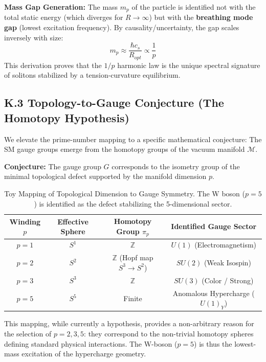 \documentclass[a4paper,12pt]{article}
\begin{document}
\textbf{Mass Gap Generation:}
The mass $m_p$ of the particle is identified not with the total static energy (which diverges for $R \to \infty$) but with the \textbf{breathing mode gap} (lowest excitation frequency). By causality/uncertainty, the gap scales inversely with size:
\begin{equation}
 m_p \approx \frac{\hbar c_s}{R_{opt}} \propto \frac{1}{p}
\end{equation}
This derivation proves that the $1/p$ harmonic law is the unique spectral signature of solitons stabilized by a tension-curvature equilibrium.

\subsection{K.3 Topology-to-Gauge Conjecture (The Homotopy Hypothesis)}
We elevate the prime-number mapping to a specific mathematical conjecture: The SM gauge groups emerge from the homotopy groups of the vacuum manifold $\mathcal{M}$.

\textbf{Conjecture:} The gauge group $G$ corresponds to the isometry group of the minimal topological defect supported by the manifold dimension $p$.

\begin{table}[H]
    \centering
    \begin{tabular}{c c c c}
        \toprule
        \textbf{Winding $p$} & \textbf{Effective Sphere} & \textbf{Homotopy Group $\pi_p$} & \textbf{Identified Gauge Sector} \\
        \midrule
        $p=1$ & $S^1$ & $\mathbb{Z}$ & $U(1)$ (Electromagnetism) \\
        $p=2$ & $S^2$ & $\mathbb{Z}$ (Hopf map $S^3 \to S^2$) & $SU(2)$ (Weak Isospin) \\
        $p=3$ & $S^3$ & $\mathbb{Z}$ & $SU(3)$ (Color / Strong) \\
        $p=5$ & $S^5$ & Finite & Anomalous Hypercharge ($U(1)_Y$) \\
        \bottomrule
    \end{tabular}
    \caption{Toy Mapping of Topological Dimension to Gauge Symmetry. The W boson ($p=5$) is identified as the defect stabilizing the 5-dimensional sector.}
\end{table}

This mapping, while currently a hypothesis, provides a non-arbitrary reason for the selection of $p=2, 3, 5$: they correspond to the non-trivial homotopy spheres defining standard physical interactions. The W-boson ($p=5$) is thus the lowest-mass excitation of the hypercharge geometry.
\end{document}
